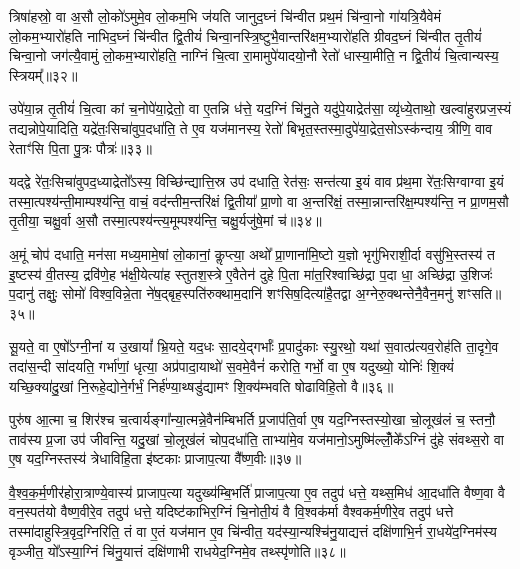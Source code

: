 त्रिषा॑हस्रो॒ वा अ॒सौ लो॒को॑\-ऽमुमे॒व लो॒कम॒भि ज॑यति जानुद॒घ्नं चि॑न्वीत प्रथ॒मं चि॑न्वा॒नो गा॑यत्रि॒यैवेमं लो॒कम॒भ्यारो॑हति नाभिद॒घ्नं चि॑न्वीत द्वि॒तीयं॑ चिन्वा॒नस्त्रि॒ष्टुभै॒वान्तरि॑क्षम॒भ्यारो॑हति ग्रीवद॒घ्नं चि॑न्वीत तृ॒तीयं॑ चिन्वा॒नो जग॑त्यै॒वामुं लो॒कम॒भ्यारो॑हति॒ नाग्निं चि॒त्वा रा॒मामुपे॑यादयो॒नौ रेतो॑ धास्या॒मीति॒ न द्वि॒तीयं॑ चि॒त्वान्यस्य॒ स्त्रियम्᳚॥३२॥

उपे॑या॒न्न तृ॒तीयं॑ चि॒त्वा कां च॒नोपे॑या॒द्रेतो॒ वा ए॒तन्नि ध॑त्ते॒ यद॒ग्निं चि॑नु॒ते यदु॑पे॒याद्रेत॑सा॒ व्यृ॑ध्ये॒ताथो॒ खल्वा॑हुरप्रज॒स्यं तद्यन्नोपे॒यादिति॒ यद्रे॑तः॒सिचा॑वुप॒दधा॑ति॒ ते ए॒व यज॑मानस्य॒ रेतो॑ बिभृत॒स्तस्मा॒दुपे॑या॒द्रेत॒सो\-ऽस्क॑न्दाय॒ त्रीणि॒ वाव रेताꣳ॑सि पि॒ता पु॒त्रः पौत्रः॑॥३३॥

यद्द्वे रे॑तः॒सिचा॑वुपद॒ध्याद्रेतो᳚\-ऽस्य॒ विच्छि॑न्द्यात्ति॒स्र उप॑ दधाति॒ रेत॑सः॒ सन्त॑त्या इ॒यं वाव प्र॑थ॒मा रे॑तः॒सिग्वाग्वा इ॒यं तस्मा॒त्पश्य॑न्ती॒माम्पश्य॑न्ति॒ वाचं॒ वद॑न्तीम॒न्तरि॑क्षं द्वि॒तीया᳚ प्रा॒णो वा अ॒न्तरि॑क्षं॒ तस्मा॒न्नान्तरि॑क्ष॒म्पश्य॑न्ति॒ न प्रा॒णम॒सौ तृ॒तीया॒ चक्षु॒र्वा अ॒सौ तस्मा॒त्पश्य॑न्त्य॒मूम्पश्य॑न्ति॒ चक्षु॒र्यजु॑षे॒मां च॑॥३४॥

अ॒मूं चोप॑ दधाति॒ मन॑सा मध्य॒मामे॒षां लो॒कानां॒ कॢप्त्या॒ अथो᳚ प्रा॒णाना॑मि॒ष्टो य॒ज्ञो भृगु॑भिराशी॒र्दा वसु॑भि॒स्तस्य॑ त इ॒ष्टस्य॑ वी॒तस्य॒ द्रवि॑णे॒ह भ॑क्षी॒येत्या॑ह स्तुतश॒स्त्रे ए॒वैतेन॑ दुहे पि॒ता मा॑त॒रिश्वाच्छि॑द्रा प॒दा धा॒ अच्छि॑द्रा उ॒शिजः॑ प॒दानु॑ तक्षुः॒ सोमो॑ विश्व॒विन्ने॒ता ने॑ष॒द्बृह॒स्पति॑रुक्थाम॒दानि॑ शꣳसिष॒दित्या॑है॒तद्वा अ॒ग्नेरु॒क्थन्तेनै॒वैन॒मनु॑ शꣳसति॥३५॥

{\anuvakamend[{मि॒नु॒यात्तृ॒तीयं॑ चिन्वा॒नस्त्रियं॒ पौत्र॑श्च॒ वै स॒प्तद॑श च॥८॥}]}

सू॒यते॒ वा ए॒षो᳚\-ऽग्नी॒नां य उ॒खायां᳚ भ्रि॒यते॒ यद॒धः सा॒दये॒द्गर्भाः᳚ प्र॒पादु॑काः स्यु॒रथो॒ यथा॑ स॒वात्प्र॑त्यव॒रोह॑ति ता॒दृगे॒व तदा॑स॒न्दी सा॑दयति॒ गर्भा॑णां॒ धृत्या॒ अप्र॑पादा॒याथो॑ स॒वमे॒वैनं॑ करोति॒ गर्भो॒ वा ए॒ष यदुख्यो॒ योनिः॑ शि॒क्यं॑ यच्छि॒क्या॑दु॒खां नि॒रूहे॒द्योने॒र्गर्भं॒ निर्\mbox{}ह॑ण्या॒थ्षडु॑द्यामꣳ शि॒क्य॑म्भवति षोढाविहि॒तो वै॥३६॥

पुरु॑ष आ॒त्मा च॒ शिर॑श्च च॒त्वार्यङ्गा᳚न्या॒त्मन्ने॒वैन॑म्बिभर्ति प्र॒जाप॑ति॒र्वा ए॒ष यद॒ग्निस्तस्यो॒खा चो॒लूख॑लं च॒ स्तनौ॒ ताव॑स्य प्र॒जा उप॑ जीवन्ति॒ यदु॒खां चो॒लूख॑लं चोप॒दधा॑ति॒ ताभ्या॑मे॒व यज॑मानो॒\-ऽमुष्मि॑ल्लोँ॒के᳚\-ऽग्निं दु॑हे संवथ्स॒रो वा ए॒ष यद॒ग्निस्तस्य॑ त्रेधाविहि॒ता इ॑ष्टकाः प्राजाप॒त्या वै᳚ष्ण॒वीः॥३७॥

वै॒श्व॒क॒र्म॒णीर॑होरा॒त्राण्ये॒वास्य॑ प्राजाप॒त्या यदुख्य॑म्बि॒भर्ति॑ प्राजाप॒त्या ए॒व तदुप॑ धत्ते॒ यथ्स॒मिध॑ आ॒दधा॑ति वैष्ण॒वा वै वन॒स्पत॑यो वैष्ण॒वीरे॒व तदुप॑ धत्ते॒ यदिष्ट॑काभिर॒ग्निं चि॒नोती॒यं वै वि॒श्वक॑र्मा वैश्वकर्म॒णीरे॒व तदुप॑ धत्ते तस्मा॑दाहुस्त्रि॒वृद॒ग्निरिति॒ तं वा ए॒तं यज॑मान ए॒व चि॑न्वीत॒ यद॑स्या॒न्यश्चि॑नु॒याद्यत्तं दक्षि॑णाभि॒र्न रा॒धये॑द॒ग्निम॑स्य वृञ्जीत॒ यो᳚\-ऽस्या॒ग्निं चि॑नु॒यात्तं दक्षि॑णाभी राधयेद॒ग्निमे॒व तथ्स्पृ॑णोति॥३८॥

